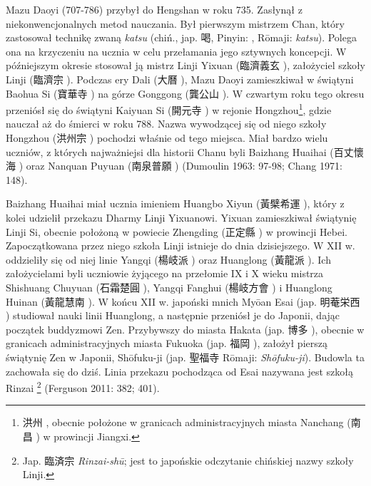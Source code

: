 Mazu Daoyi (707-786) przybył do Hengshan w roku 735.
Zasłynął z niekonwencjonalnych metod nauczania.
Był pierwszym mistrzem Chan, który zastosował technikę zwaną \textit{katsu} (chiń., jap. 喝, Pinyin: , Rōmaji: \textit{katsu}).
Polega ona na krzyczeniu na ucznia w celu przełamania jego sztywnych koncepcji.
W późniejszym okresie stosował ją mistrz Linji Yixuan (臨濟義玄 ), założyciel szkoły Linji (臨濟宗 ). %
Podczas ery Dali (大曆 ), Mazu Daoyi zamieszkiwał w świątyni Baohua Si (寶華寺 ) na górze Gonggong (龔公山 ).
W czwartym roku tego okresu przeniósł się do świątyni Kaiyuan Si (開元寺 ) w rejonie Hongzhou\footnote{洪州 , obecnie położone w granicach administracyjnych miasta Nanchang (南昌 ) w prowincji Jiangxi.}, gdzie nauczał aż do śmierci w roku 788.
Nazwa wywodzącej się od niego szkoły Hongzhou (洪州宗 ) pochodzi właśnie od tego miejsca.
Miał bardzo wielu uczniów, z których najważniejsi dla historii Chanu byli Baizhang Huaihai (百丈懷海 ) oraz Nanquan Puyuan (南泉普願 )
(Dumoulin 1963: 97-98; Chang 1971: 148).

Baizhang Huaihai miał ucznia imieniem Huangbo Xiyun (黃檗希運 ), który z kolei udzielił przekazu Dharmy Linji Yixuanowi.
Yixuan zamieszkiwał świątynię Linji Si, obecnie położoną w powiecie Zhengding (正定縣 ) w prowincji Hebei.
Zapoczątkowana przez niego szkoła Linji istnieje do dnia dzisiejszego.
W XII w. oddzieliły się od niej linie Yangqi (楊岐派 ) oraz Huanglong (黃龍派 ).
Ich założycielami byli uczniowie żyjącego na przełomie IX i X wieku mistrza Shishuang Chuyuan (石霜楚圓 ), Yangqi Fanghui (楊岐方會 ) i Huanglong Huinan (黃龍慧南 ).
W końcu XII w. japoński mnich Myōan Esai (jap. 明菴栄西 ) studiował nauki linii Huanglong, a następnie przeniósł je do Japonii, dając początek buddyzmowi Zen.
Przybywszy do miasta Hakata (jap. {\ipaexgothic 博多} ), obecnie w granicach administracyjnych miasta Fukuoka (jap. {\ipaexgothic 福岡} ), założył pierszą świątynię Zen w Japonii, Shōfuku-ji (jap. {\ipaexgothic 聖福寺} Rōmaji: \textit{Shōfuku-ji}).
Budowla ta zachowała się do dziś.
Linia przekazu pochodząca od Esai nazywana jest szkołą Rinzai%
\footnote{Jap. {\ipaexgothic 臨済宗} \textit{Rinzai-shū}; jest to japońskie odczytanie chińskiej nazwy szkoły Linji.}
(Ferguson 2011: 382; 401).

